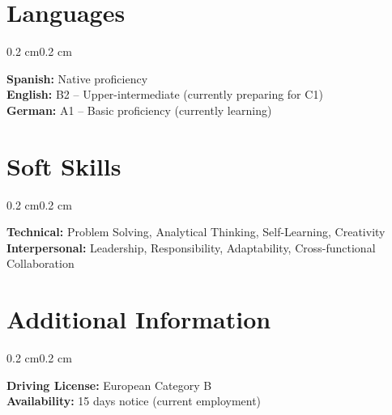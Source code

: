 \documentclass[10pt, letterpaper]{article}
\newenvironment{onecolentry}{
    \begin{adjustwidth}{0.2 cm}{0.2 cm}
}{
    \end{adjustwidth}
}
\begin{document}
    \section{Languages}
    \begin{onecolentry}
        \textbf{Spanish:} Native proficiency \\
        \textbf{English:} B2 – Upper-intermediate (currently preparing for C1) \\
        \textbf{German:} A1 – Basic proficiency (currently learning)
    \end{onecolentry}

    \section{Soft Skills}
    \begin{onecolentry}
        \textbf{Technical:} Problem Solving, Analytical Thinking, Self-Learning, Creativity \\
        \textbf{Interpersonal:} Leadership, Responsibility, Adaptability, Cross-functional Collaboration
    \end{onecolentry}

    \section{Additional Information}
    \begin{onecolentry}
        \textbf{Driving License:} European Category B \\
        \textbf{Availability:} 15 days notice (current employment)
    \end{onecolentry}
\end{document}
